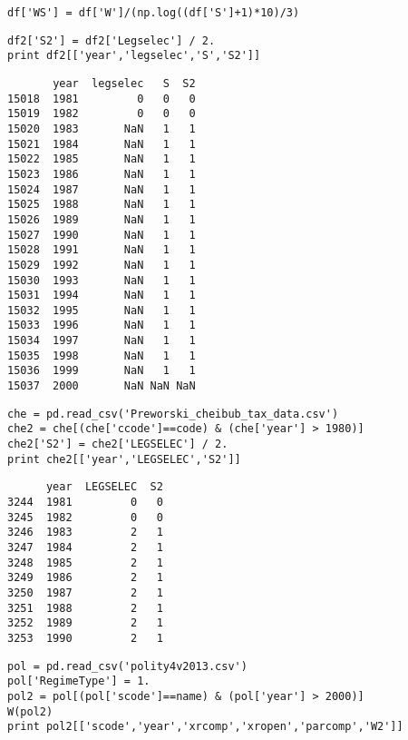 \documentclass[12pt,fleqn]{article}\usepackage{common}
\begin{document}

\begin{verbatim}
df['WS'] = df['W']/(np.log((df['S']+1)*10)/3)
\end{verbatim}


\begin{verbatim}
df2['S2'] = df2['Legselec'] / 2.
print df2[['year','legselec','S','S2']]
\end{verbatim}

\begin{verbatim}
       year  legselec   S  S2
15018  1981         0   0   0
15019  1982         0   0   0
15020  1983       NaN   1   1
15021  1984       NaN   1   1
15022  1985       NaN   1   1
15023  1986       NaN   1   1
15024  1987       NaN   1   1
15025  1988       NaN   1   1
15026  1989       NaN   1   1
15027  1990       NaN   1   1
15028  1991       NaN   1   1
15029  1992       NaN   1   1
15030  1993       NaN   1   1
15031  1994       NaN   1   1
15032  1995       NaN   1   1
15033  1996       NaN   1   1
15034  1997       NaN   1   1
15035  1998       NaN   1   1
15036  1999       NaN   1   1
15037  2000       NaN NaN NaN
\end{verbatim}

\begin{verbatim}
che = pd.read_csv('Preworski_cheibub_tax_data.csv')
che2 = che[(che['ccode']==code) & (che['year'] > 1980)]
che2['S2'] = che2['LEGSELEC'] / 2.
print che2[['year','LEGSELEC','S2']]
\end{verbatim}

\begin{verbatim}
      year  LEGSELEC  S2
3244  1981         0   0
3245  1982         0   0
3246  1983         2   1
3247  1984         2   1
3248  1985         2   1
3249  1986         2   1
3250  1987         2   1
3251  1988         2   1
3252  1989         2   1
3253  1990         2   1
\end{verbatim}

\begin{verbatim}
pol = pd.read_csv('polity4v2013.csv')
pol['RegimeType'] = 1.
pol2 = pol[(pol['scode']==name) & (pol['year'] > 2000)]
W(pol2)
print pol2[['scode','year','xrcomp','xropen','parcomp','W2']]
\end{verbatim}
\end{document}
